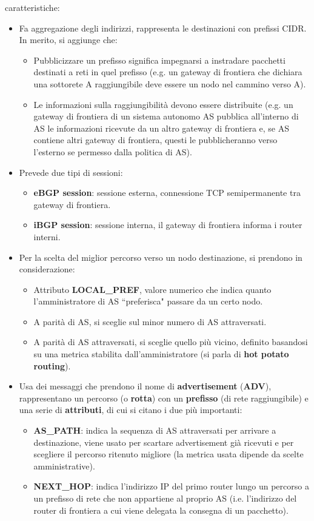 \documentclass[11pt, italian, openany]{book}
\begin{document}
\begin{sloppypar}
caratteristiche:
\begin{itemize}[topsep=0pt, itemsep=0pt, parsep=0pt]
	\item Fa aggregazione degli indirizzi, rappresenta le destinazioni con prefissi CIDR. In merito, si aggiunge che:
	\begin{itemize}
		\item Pubblicizzare un prefisso significa impegnarsi a instradare pacchetti destinati a reti in quel prefisso (e.g. un gateway di frontiera
		che dichiara una sottorete A raggiungibile deve essere un nodo nel cammino verso A).
		\item Le informazioni sulla raggiungibilit\`a devono essere distribuite (e.g. un gateway di frontiera di un sistema autonomo AS pubblica all'interno
		di AS le informazioni ricevute da un altro gateway di frontiera e, se AS contiene altri gateway di frontiera, questi le pubblicheranno verso
		l'esterno se permesso dalla politica di AS).
	\end{itemize}
	\item Prevede due tipi di sessioni:
	\begin{itemize}
		\item \textbf{eBGP session}: sessione esterna, connessione TCP semipermanente tra gateway di frontiera.
		\item \textbf{iBGP session}: sessione interna, il gateway di frontiera informa i router interni.
	\end{itemize}
	\item Per la scelta del miglior percorso verso un nodo destinazione, si prendono in considerazione:
	\begin{itemize}
		\item Attributo \textbf{LOCAL\_PREF}, valore numerico che indica quanto l'amministratore di AS ``preferisca" passare da un certo nodo.
		\item A parit\`a di AS, si sceglie sul minor numero di AS attraversati.
		\item A parit\`a di AS attraversati, si sceglie quello pi\`u vicino, definito basandosi su una metrica stabilita dall'amministratore (si parla di
		\textbf{hot potato routing}).
	\end{itemize}
	\item Usa dei messaggi che prendono il nome di \textbf{advertisement} (\textbf{ADV}), rappresentano un percorso (o \textbf{rotta}) con un \textbf{prefisso}
	(di rete raggiungibile) e una serie di \textbf{attributi}, di cui si citano i due pi\`u importanti:
	\begin{itemize}
		\item \textbf{AS\_PATH}: indica la sequenza di AS attraversati per arrivare a destinazione, viene usato per scartare advertisement gi\`a ricevuti
		e per scegliere il percorso ritenuto migliore (la metrica usata dipende da scelte amministrative).
		\item \textbf{NEXT\_HOP}: indica l'indirizzo IP del primo router lungo un percorso a un prefisso di rete che non appartiene al proprio AS (i.e.
		l'indirizzo del router di frontiera a cui viene delegata la consegna di un pacchetto).
	\end{itemize}
\end{itemize}


\end{sloppypar}
\end{document}
